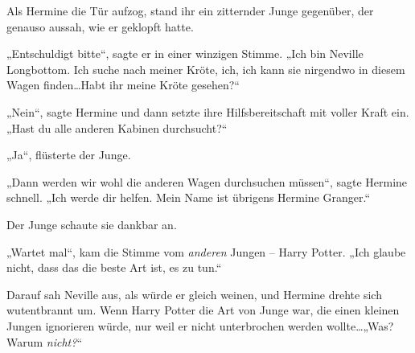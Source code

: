 Als Hermine die Tür aufzog, stand ihr ein zitternder Junge gegenüber, der genauso aussah, wie er geklopft hatte.

„Entschuldigt bitte“, sagte er in einer winzigen Stimme. „Ich bin Neville Longbottom. Ich suche nach meiner Kröte, ich, ich kann sie nirgendwo in diesem Wagen finden…Habt ihr meine Kröte gesehen?“

„Nein“, sagte Hermine und dann setzte ihre Hilfsbereitschaft mit voller Kraft ein. „Hast du alle anderen Kabinen durchsucht?“

„Ja“, flüsterte der Junge.

„Dann werden wir wohl die anderen Wagen durchsuchen müssen“, sagte Hermine schnell. „Ich werde dir helfen. Mein Name ist übrigens Hermine Granger.“

Der Junge schaute sie dankbar an.

„Wartet mal“, kam die Stimme vom \emph{anderen} Jungen – Harry Potter. „Ich glaube nicht, dass das die beste Art ist, es zu tun.“

Darauf sah Neville aus, als würde er gleich weinen, und Hermine drehte sich wutentbrannt um. Wenn Harry Potter die Art von Junge war, die einen kleinen Jungen ignorieren würde, nur weil er nicht unterbrochen werden wollte…„Was? Warum \emph{nicht?}“

